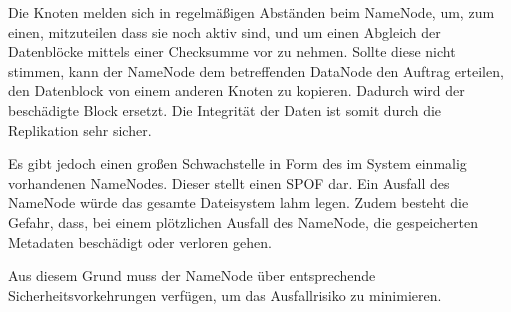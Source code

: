 Die Knoten melden sich in regelmäßigen Abständen beim NameNode, um, zum einen, mitzuteilen dass sie noch aktiv sind, und um einen Abgleich der Datenblöcke mittels einer Checksumme vor zu nehmen. Sollte diese nicht stimmen, kann der NameNode dem betreffenden DataNode den Auftrag erteilen, den Datenblock von einem anderen Knoten zu kopieren. Dadurch wird der beschädigte Block ersetzt. Die Integrität der Daten ist somit durch die Replikation sehr sicher.

Es gibt jedoch einen großen Schwachstelle in Form des im System einmalig vorhandenen NameNodes. Dieser stellt einen \ac{SPOF} dar. Ein Ausfall des NameNode würde das gesamte Dateisystem lahm legen. Zudem besteht die Gefahr, dass, bei einem plötzlichen Ausfall des NameNode, die gespeicherten Metadaten beschädigt oder verloren gehen.

Aus diesem Grund muss der NameNode über entsprechende Sicherheitsvorkehrungen verfügen, um das Ausfallrisiko zu minimieren.


